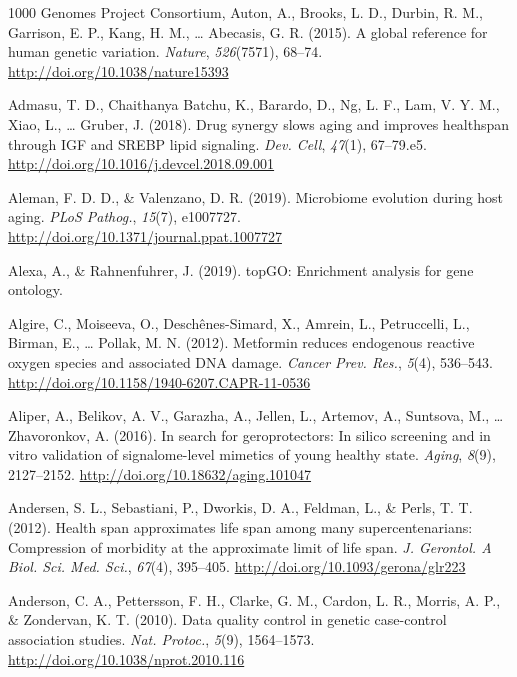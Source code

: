 \documentclass[12pt,twoside]{unicam}
\begin{document}
\hypertarget{refs}{}
\begin{cslreferences}
\leavevmode\hypertarget{ref-1000_Genomes_Project_Consortium2015}{}%
1000 Genomes Project Consortium, Auton, A., Brooks, L. D., Durbin, R. M., Garrison, E. P., Kang, H. M., \ldots{} Abecasis, G. R. (2015). A global reference for human genetic variation. \emph{Nature}, \emph{526}(7571), 68--74. \url{http://doi.org/10.1038/nature15393}

\leavevmode\hypertarget{ref-Admasu2018}{}%
Admasu, T. D., Chaithanya Batchu, K., Barardo, D., Ng, L. F., Lam, V. Y. M., Xiao, L., \ldots{} Gruber, J. (2018). Drug synergy slows aging and improves healthspan through IGF and SREBP lipid signaling. \emph{Dev. Cell}, \emph{47}(1), 67--79.e5. \url{http://doi.org/10.1016/j.devcel.2018.09.001}

\leavevmode\hypertarget{ref-Aleman2019}{}%
Aleman, F. D. D., \& Valenzano, D. R. (2019). Microbiome evolution during host aging. \emph{PLoS Pathog.}, \emph{15}(7), e1007727. \url{http://doi.org/10.1371/journal.ppat.1007727}

\leavevmode\hypertarget{ref-Alexa2019}{}%
Alexa, A., \& Rahnenfuhrer, J. (2019). topGO: Enrichment analysis for gene ontology.

\leavevmode\hypertarget{ref-Algire2012}{}%
Algire, C., Moiseeva, O., Deschênes-Simard, X., Amrein, L., Petruccelli, L., Birman, E., \ldots{} Pollak, M. N. (2012). Metformin reduces endogenous reactive oxygen species and associated DNA damage. \emph{Cancer Prev. Res.}, \emph{5}(4), 536--543. \url{http://doi.org/10.1158/1940-6207.CAPR-11-0536}

\leavevmode\hypertarget{ref-Aliper2016}{}%
Aliper, A., Belikov, A. V., Garazha, A., Jellen, L., Artemov, A., Suntsova, M., \ldots{} Zhavoronkov, A. (2016). In search for geroprotectors: In silico screening and in vitro validation of signalome-level mimetics of young healthy state. \emph{Aging}, \emph{8}(9), 2127--2152. \url{http://doi.org/10.18632/aging.101047}

\leavevmode\hypertarget{ref-Andersen2012}{}%
Andersen, S. L., Sebastiani, P., Dworkis, D. A., Feldman, L., \& Perls, T. T. (2012). Health span approximates life span among many supercentenarians: Compression of morbidity at the approximate limit of life span. \emph{J. Gerontol. A Biol. Sci. Med. Sci.}, \emph{67}(4), 395--405. \url{http://doi.org/10.1093/gerona/glr223}

\leavevmode\hypertarget{ref-Anderson2010}{}%
Anderson, C. A., Pettersson, F. H., Clarke, G. M., Cardon, L. R., Morris, A. P., \& Zondervan, K. T. (2010). Data quality control in genetic case-control association studies. \emph{Nat. Protoc.}, \emph{5}(9), 1564--1573. \url{http://doi.org/10.1038/nprot.2010.116}


\end{cslreferences}
\end{document}
